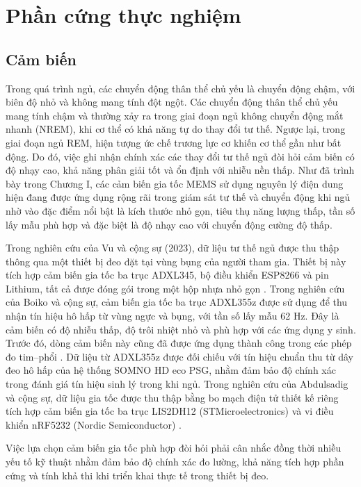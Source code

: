 
\section{Phần cứng thực nghiệm \label{section_overview_propsed_method}}
\subsection{Cảm biến \label{section_overview_propsed_method}}

Trong quá trình ngủ, các chuyển động thân thể chủ yếu là chuyển động 
chậm, với biên độ nhỏ và không mang tính đột ngột. 
Các chuyển động thân thể chủ yếu mang tính chậm và thường xảy ra 
trong giai đoạn ngủ không chuyển động mắt nhanh (NREM), 
khi cơ thể có khả năng tự do thay đổi tư thế. Ngược lại, 
trong giai đoạn ngủ REM, hiện tượng ức chế trương lực cơ khiến 
cơ thể gần như bất động.
Do đó, việc ghi 
nhận chính xác các thay đổi tư thế ngủ đòi hỏi cảm biến có độ nhạy cao, 
khả năng phân giải tốt và ổn định với nhiễu nền thấp. Như đã trình bày 
trong Chương I, các cảm biến gia tốc MEMS sử dụng nguyên lý điện dung 
hiện đang được ứng dụng rộng rãi trong giám sát tư thế và chuyển động 
khi ngủ nhờ vào đặc điểm nổi bật là kích thước nhỏ gọn, tiêu thụ năng 
lượng thấp, tần số lấy mẫu phù hợp và đặc biệt là độ nhạy cao với 
chuyển động cường độ thấp.

Trong nghiên cứu của Vu và cộng sự (2023), dữ liệu tư thế ngủ được thu 
thập thông qua một thiết bị đeo đặt tại vùng bụng của người tham gia. 
Thiết bị này tích hợp cảm biến gia tốc ba trục ADXL345, 
bộ điều khiển ESP8266 và pin Lithium, tất cả được đóng gói trong 
một hộp nhựa nhỏ gọn \cite{vu2023}. Trong nghiên cứu của Boiko 
và cộng sự, cảm biến gia tốc ba trục ADXL355z 
được sử dụng để thu nhận tín hiệu hô hấp từ vùng ngực và bụng, 
với tần số lấy mẫu 62 Hz. Đây là cảm biến có độ nhiễu thấp, 
độ trôi nhiệt nhỏ và phù hợp với các ứng dụng y sinh. Trước đó, 
dòng cảm biến này cũng đã được ứng dụng thành công trong các phép 
đo tim–phổi \cite{Boiko2023}. Dữ liệu từ ADXL355z được đối chiếu với tín hiệu chuẩn 
thu từ dây đeo hô hấp của hệ thống SOMNO HD eco PSG, nhằm đảm bảo 
độ chính xác trong đánh giá tín hiệu sinh lý trong khi ngủ.
Trong nghiên cứu của Abdulsadig và cộng sự, dữ liệu gia tốc được 
thu thập bằng bo mạch điện tử thiết kế riêng tích hợp cảm biến gia tốc 
ba trục LIS2DH12 (STMicroelectronics) và vi điều khiển nRF5232 
(Nordic Semiconductor) \cite{Sleep_Posture_Detection}.



Việc lựa chọn cảm biến gia tốc phù hợp đòi hỏi phải cân nhắc 
đồng thời nhiều yếu tố kỹ thuật nhằm đảm bảo độ chính xác đo lường, 
khả năng tích hợp phần cứng và tính khả thi khi triển khai thực 
tế trong thiết bị đeo. 

